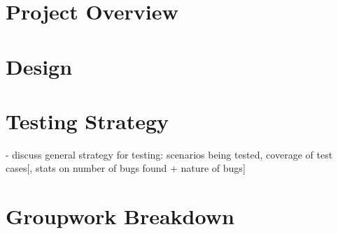 \documentclass{article}
\begin{document}
\section{Project Overview}

\section{Design}

\section{Testing Strategy}
- discuss general strategy for testing: scenarios being tested, coverage of test cases[, stats on number of bugs found + nature of bugs]

\section{Groupwork Breakdown}



\end{document}
